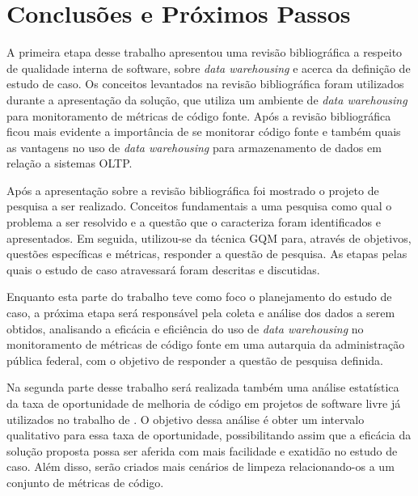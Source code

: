 \chapter{Conclusões e Próximos Passos}

A primeira etapa desse trabalho apresentou uma revisão bibliográfica a respeito de qualidade interna de software, sobre \textit{data warehousing} e acerca da definição de estudo de caso. Os conceitos levantados na revisão bibliográfica foram utilizados durante a apresentação da solução, que utiliza um ambiente de \textit{data warehousing} para monitoramento de métricas de código fonte. Após a revisão bibliográfica ficou mais evidente a importância de se monitorar código fonte e também quais as vantagens no uso de \textit{data warehousing} para armazenamento de dados em relação a sistemas OLTP. 

Após a apresentação sobre a revisão bibliográfica foi mostrado o projeto de pesquisa a ser realizado. Conceitos fundamentais a uma pesquisa como qual o problema a ser resolvido e a questão que o caracteriza foram identificados e apresentados. Em seguida, utilizou-se da  técnica GQM para, através de objetivos, questões específicas e métricas, responder a questão de pesquisa. As etapas pelas quais o estudo de caso atravessará foram descritas e discutidas.

Enquanto esta parte do trabalho teve como foco o planejamento do estudo de caso, a próxima etapa será responsável pela coleta e análise dos dados a serem obtidos, analisando a eficácia e eficiência do uso de \textit{data warehousing} no monitoramento de métricas de código fonte em uma autarquia da administração pública federal, com o objetivo de responder a questão de pesquisa definida.

Na segunda parte desse trabalho será realizada também uma análise estatística da taxa de oportunidade de melhoria de código em projetos de software livre já utilizados no trabalho de \cite{Meirelles2013}. O objetivo dessa análise é obter um intervalo qualitativo para essa taxa de oportunidade, possibilitando assim que a eficácia da solução proposta possa ser aferida com mais facilidade e exatidão no estudo de caso. Além disso, serão criados mais cenários de limpeza relacionando-os a um conjunto de métricas de código.